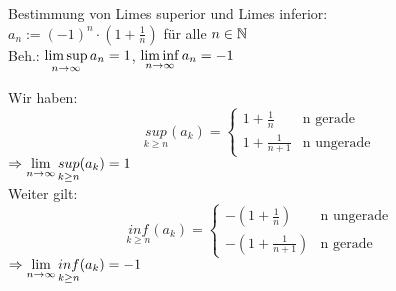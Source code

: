 \documentclass[../ana1u.tex]{subfiles}
\begin{document}
\begin{bsp}
    Bestimmung von Limes superior und Limes inferior:\\
    \(a_n := (-1)^n \cdot (1 + \frac{1}{n})\) für alle \(n \in \mathbb{N}\)\\
    Beh.: \(\limsup\limits_{n\rightarrow\infty} a_n = 1\), \(\liminf\limits_{n\rightarrow\infty} a_n = -1\)\\
    \begin{bew}
        Wir haben:
        \[\underset{k \geq n}{sup} (a_k) =\begin{cases}
        1 + \frac{1}{n} & \text{n gerade}\\
        1 + \frac{1}{n + 1} & \text{n ungerade}
        \end{cases} \]
        \(\Rightarrow \lim\limits_{n\rightarrow\infty} \underset{k \geq n}{sup} (a_k) = 1\)\\
        Weiter gilt:
        \[\underset{k \geq n}{inf} (a_k) =\begin{cases}
        -(1 + \frac{1}{n} )& \text{n ungerade}\\
        -(1 + \frac{1}{n + 1}) & \text{n gerade}
        \end{cases} \]
        \(\Rightarrow \lim\limits_{n\rightarrow\infty} \underset{k \geq n}{inf} (a_k) = -1\)\\
    \end{bew}
\end{bsp}
\end{document}
